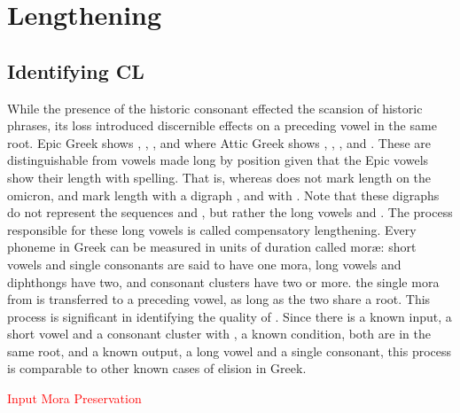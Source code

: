 \section{Lengthening}\label{sec:Lengthening}

\subsection{Identifying CL}
While the presence of the historic consonant  effected the scansion of historic phrases, its loss introduced discernible effects on a preceding vowel in the same root. Epic Greek shows , , , and  where Attic Greek shows , , , and . These are distinguishable from vowels made long by position given that the Epic vowels show their length with spelling. That is, whereas  does not mark length on the omicron,  and  mark length with a digraph , and  with . Note that these digraphs do not represent the sequences  and , but rather the long vowels  and . The process responsible for these long vowels is called compensatory lengthening. Every phoneme in Greek can be measured in units of duration called mor\ae: short vowels and single consonants are said to have one mora, long vowels and diphthongs have two, and consonant clusters have two or more.  the single mora from \greek{*\w} is transferred to a preceding vowel, as long as the two share a root. This process is significant in identifying the quality of . Since there is a known input, a short vowel and a consonant cluster with \greek{*\w},  a known condition, both are in the same root, and a known output, a long vowel and a single consonant, this process is comparable to other known cases of elision in Greek.

\noindent\textcolor{red}{Input Mora Preservation}


